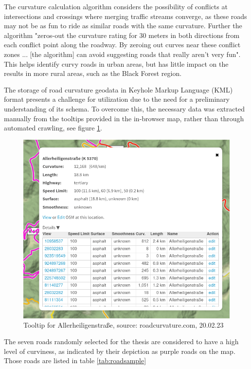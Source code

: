 The curvature calculation algorithm considers the possibility of conflicts at intersections and crossings where merging traffic streams converge, as these roads may not be as fun to ride as similar roads with the same curvature. Further the algorithm "zeros-out the curvature rating for 30 meters in both directions from each conflict point along the roadway. By zeroing out curves near these conflict zones ... [the algorithm] can avoid suggesting roads that really aren't very fun\cite{roadcurvature.com}". This helps identify curvy roads in urban areas, but has little impact on the results in more rural areas, such as the Black Forest region.

The storage of road curvature geodata in Keyhole Markup Language (KML) format presents a challenge for utilization due to the need for a preliminary understanding of its schema. To overcome this, the necessary data was extracted manually from the tooltips provided in the in-browser map, rather than through automated crawling, see figure \ref{fig:tooltip}.

\begin{figure}[h]
    \centering
    \includegraphics[width=0.8\linewidth]{images/tooltip.png}
    \caption{Tooltip for Allerheiligenstraße, source: roadcurvature.com, 20.02.23}
    \label{fig:tooltip}
\end{figure}

The seven roads randomly selected for the thesis are considered to have a high level of curviness, as indicated by their depiction as purple roads on the map. Those roads are listed in table \ref{tab:roadsample}

